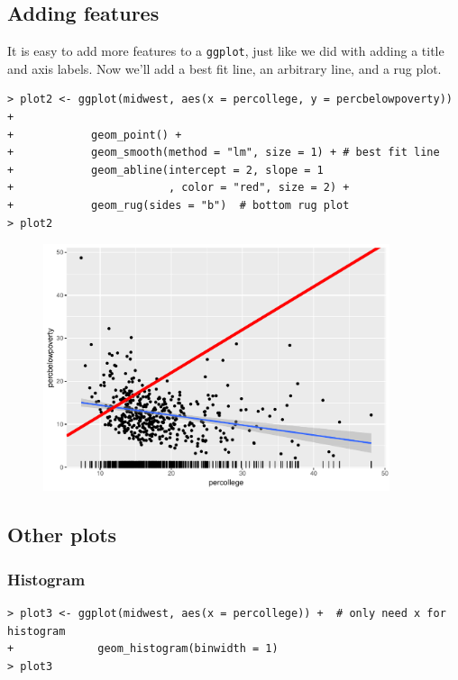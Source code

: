 \subsection{Adding features}

It is easy to add more features to a \texttt{ggplot}, just like we did with adding a title and axis labels. Now we'll add a best fit line, an arbitrary line, and a rug plot.

\begin{lstlisting}
> plot2 <- ggplot(midwest, aes(x = percollege, y = percbelowpoverty)) +
+            geom_point() +            
+            geom_smooth(method = "lm", size = 1) + # best fit line
+            geom_abline(intercept = 2, slope = 1
+                        , color = "red", size = 2) +
+            geom_rug(sides = "b")  # bottom rug plot
> plot2
\end{lstlisting}

\begin{figure}[h!]
\centering
\includegraphics[width=4in]{plots/08.pdf} 
\end{figure}

\subsection{Other plots}

\subsubsection*{Histogram}

\begin{lstlisting}
> plot3 <- ggplot(midwest, aes(x = percollege)) +  # only need x for histogram
+             geom_histogram(binwidth = 1)
> plot3
\end{lstlisting}

